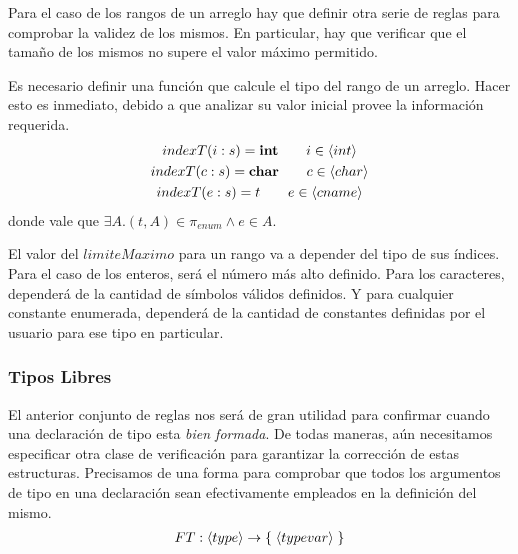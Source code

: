 \documentclass{article}
\begin{document}
Para el caso de los rangos de un arreglo hay que definir otra serie de reglas para comprobar la validez de los mismos.
En particular, hay que verificar que el tamaño de los mismos no supere el valor máximo permitido.

\begin{prooftree}
\end{prooftree}

Es necesario definir una función que calcule el tipo del rango de un arreglo.
Hacer esto es inmediato, debido a que analizar su valor inicial provee la información requerida.
\begin{gather*}
indexT(i : s) = \T{int} \qquad i \in \NT{int}
\\
indexT(c : s) = \T{char} \qquad c \in \NT{char}
\\
indexT(e : s) = t \qquad e \in \NT{cname}
\end{gather*}
donde vale que $\exists A. (t, A) \in \pi_{enum} \wedge e \in A$.

El valor del $limiteMaximo$ para un rango va a depender del tipo de sus índices.
Para el caso de los enteros, será el número más alto definido.
Para los caracteres, dependerá de la cantidad de símbolos válidos definidos.
Y para cualquier constante enumerada, dependerá de la cantidad de constantes definidas por el usuario para ese tipo en particular.

\subsubsection{Tipos Libres}

El anterior conjunto de reglas nos será de gran utilidad para confirmar cuando una declaración de tipo esta \textit{bien formada}.
De todas maneras, aún necesitamos especificar otra clase de verificación para garantizar la corrección de estas estructuras.
Precisamos de una forma para comprobar que todos los argumentos de tipo en una declaración sean efectivamente empleados en la definición del mismo.
\begin{gather*}
FT: \NT{type} \RA \{ \; \NT{typevar} \; \}
\end{gather*}
\end{document}

